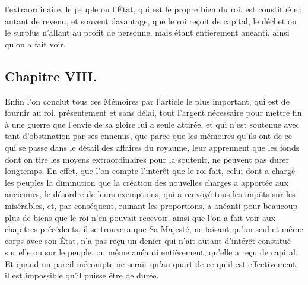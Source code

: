 \documentclass[french,twoside]{book} %
\begin{document}
l’extraordinaire, le peuple ou l’État, qui est le propre bien du roi, est constitué en autant de revenu, et souvent davantage, que le roi reçoit de capital, le déchet ou le surplus n’allant au profit de personne, mais étant entièrement anéanti, ainsi qu’on a fait voir.
\subsection[{Chapitre VIII.}]{Chapitre VIII.}
\noindent Enfin l’on conclut tous ces Mémoires par l’article le plus important, qui est de fournir au roi, présentement et sans délai, tout l’argent nécessaire pour mettre fin à une guerre que l’envie de sa gloire lui a seule attirée, et qui n’est soutenue avec tant d’obstination par ses ennemis, que parce que les mémoires qu’ils ont de ce qui se passe dans le détail des affaires du royaume, leur apprennent que les fonds dont on tire les moyens extraordinaires pour la soutenir, ne peuvent pas durer longtemps. En effet, que l’on compte l’intérêt que le roi fait, celui dont a chargé les peuples la diminution que la création des nouvelles charges a apportée aux anciennes, le désordre de leurs exemptions, qui a renvoyé tous les impôts sur les misérables, et, par conséquent, ruinant les proportions, a anéanti pour beaucoup plus de biens que le roi n’en pouvait recevoir, ainsi que l’on a fait voir aux chapitres précédents, il se trouvera que Sa Majesté, ne faisant qu’un seul et même corps avec son État, n’a pas reçu un denier qui n’ait autant d’intérêt constitué sur elle ou sur le peuple, ou même anéanti entièrement, qu’elle a reçu de capital. Et quand un pareil mécompte ne serait qu’au quart de ce qu’il est effectivement, il est impossible qu’il puisse être de durée.\par
\end{document}
